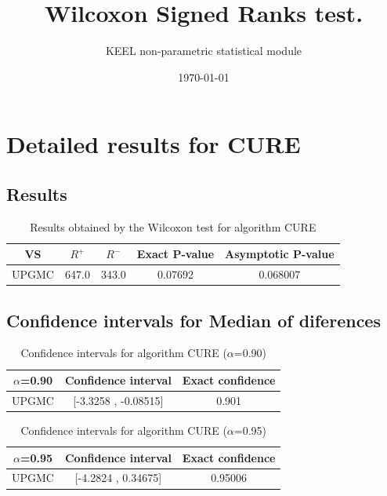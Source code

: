 \documentclass[a4paper,10pt]{article}
\title{Wilcoxon Signed Ranks test.}
\date{\today}
\author{KEEL non-parametric statistical module}
\begin{document}
\pagestyle{empty}
\maketitle
\thispagestyle{empty}



\section{Detailed results for CURE}


\subsection{Results}

\begin{table}[!htp]
\centering\small
\begin{tabular}{
|c|c|c|c|c|}
\hline
 VS & $R^{+}$ & $R^{-}$ & Exact P-value & Asymptotic P-value \\ \hline 
UPGMC & 647.0 & 343.0 & 0.07692 & 0.068007\\ \hline 

\end{tabular}
\caption{Results obtained by the Wilcoxon test for algorithm CURE}
\end{table}

\subsection{Confidence intervals for Median of diferences}

\begin{table}[!htp]
\centering\small
\begin{tabular}{
|c|c|c|}
\hline
 $\alpha$=0.90 & Confidence interval & Exact confidence \\ \hline 
UPGMC & [-3.3258 , -0.08515] & 0.901\\ \hline 

\end{tabular}
\caption{Confidence intervals for algorithm CURE ($\alpha$=0.90)}
\end{table}
\begin{table}[!htp]
\centering\small
\begin{tabular}{
|c|c|c|}
\hline
 $\alpha$=0.95 & Confidence interval & Exact confidence \\ \hline 
UPGMC & [-4.2824 , 0.34675] & 0.95006\\ \hline 

\end{tabular}
\caption{Confidence intervals for algorithm CURE ($\alpha$=0.95)}
\end{table}
\end{document}

